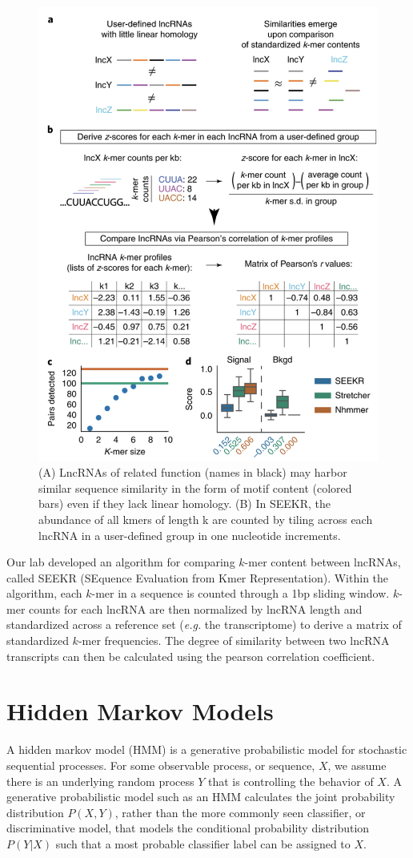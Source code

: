  \begin{figure}[t!]
\centering
\includegraphics[width=.8\textwidth]{images/seekr.png}
\caption[width=.8\textwidth]{(A) LncRNAs of related function (names in black) may harbor similar sequence similarity in the form of motif content (colored bars) even if they lack linear homology. (B) In SEEKR, the abundance of all kmers of length k are counted by tiling across each lncRNA in a user-defined group in one nucleotide increments.}
\label{fig:seekr}
\end{figure}

Our lab developed an algorithm for comparing $k$-mer content between lncRNAs, called SEEKR (SEquence Evaluation from Kmer Representation). Within the algorithm, each $k$-mer in a sequence is counted through a 1bp sliding window. $k$-mer counts for each lncRNA are then normalized by lncRNA length and standardized across a reference set (\emph{e.g.} the transcriptome) to derive a matrix of standardized $k$-mer frequencies. The degree of similarity between two lncRNA transcripts can then be calculated using the pearson correlation coefficient.


\section{Hidden Markov Models}
A hidden markov model (HMM) is a generative probabilistic model for stochastic sequential processes. For some observable process, or sequence, $X$, we assume there is an underlying random process $Y$ that is controlling the behavior of $X$. A generative probabilistic model such as an HMM calculates the joint probability distribution $P(X,Y)$, rather than the more commonly seen classifier, or discriminative model, that models the conditional probability distribution $P(Y|X)$ such that a most probable classifier label can be assigned to $X$.

